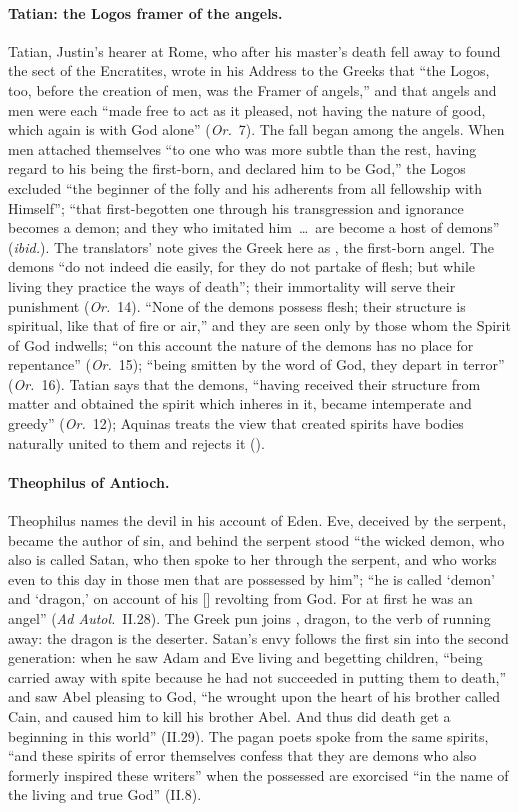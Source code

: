 \paragraph{Tatian: the Logos framer of the angels.} Tatian, Justin's
hearer at Rome, who after his master's death fell away to found the
sect of the Encratites, wrote in his Address to the Greeks that ``the
Logos, too, before the creation of men, was the Framer of angels,'' and
that angels and men were each ``made free to act as it pleased, not having
the nature of good, which again is with God alone'' (\emph{Or.}\ 7). The
fall began among the angels. When men attached themselves ``to one who was
more subtle than the rest, having regard to his being the first-born, and
declared him to be God,'' the Logos excluded ``the beginner of the folly
and his adherents from all fellowship with Himself''; ``that first-begotten
one through his transgression and ignorance becomes a demon; and they who
imitated him~\dots\ are become a host of demons'' (\emph{ibid.}). The
translators' note gives the Greek here as , the
first-born angel. The demons ``do not indeed die easily, for they do not
partake of flesh; but while living they practice the ways of death''; their
immortality will serve their punishment (\emph{Or.}\ 14). ``None of the
demons possess flesh; their structure is spiritual, like that of fire or
air,'' and they are seen only by those whom the Spirit of God indwells;
``on this account the nature of the demons has no place for repentance''
(\emph{Or.}\ 15); ``being smitten by the word of God, they depart in
terror'' (\emph{Or.}\ 16). Tatian says that the demons, ``having received their structure from
matter and obtained the spirit which inheres in it, became intemperate and
greedy'' (\emph{Or.}\ 12); Aquinas
treats the view that created spirits have bodies naturally united to them
and rejects it ().

\paragraph{Theophilus of Antioch.} Theophilus names the devil in his account
of Eden. Eve, deceived by the serpent, became the author of sin, and behind the serpent stood ``the wicked demon, who also is called
Satan, who then spoke to her through the serpent, and who works even to
this day in those men that are possessed by him''; ``he is called `demon' and `dragon,' on account
of his [] revolting from God. For at first he was an
angel'' (\emph{Ad Autol.}\ II.28). The Greek pun joins ,
dragon, to the verb of running away: the dragon is the deserter. Satan's
envy follows the first sin into the second generation: when he saw Adam
and Eve living and begetting children, ``being carried away with spite
because he had not succeeded in putting them to death,'' and saw Abel
pleasing to God, ``he wrought upon the heart of his brother called Cain,
and caused him to kill his brother Abel. And thus did death get a
beginning in this world'' (II.29). The pagan poets spoke from the same
spirits, ``and these spirits of error themselves confess that they are
demons who also formerly inspired these writers'' when the possessed are
exorcised ``in the name of the living and true God'' (II.8).

